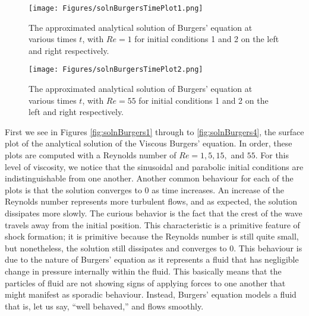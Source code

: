 \documentclass[undefended]{sfuthesis}
\begin{document}
\begin{figure}[h!]
	\centering
	\texttt{[image: Figures/solnBurgersTimePlot1.png]}
	\caption{The approximated analytical solution of Burgers' equation at various times $t$, with $Re = 1$ for initial conditions 1 and 2 on the left and right respectively.}
	\label{fig:solnBurgersTimePlot1}
\end{figure}

\begin{figure}[h!]
	\centering
	\texttt{[image: Figures/solnBurgersTimePlot2.png]}
	\caption{The approximated analytical solution of Burgers' equation at various times $t$, with $Re = 55$ for initial conditions 1 and 2 on the left and right respectively.}
	\label{fig:solnBurgersTimePlot2}
\end{figure}
\clearpage

First we see in Figures \ref{fig:solnBurgers1} through to \ref{fig:solnBurgers4}, the surface plot of the analytical solution of the Viscous Burgers' equation. In order, these plots are computed with a Reynolds number of $Re = 1, 5, 15,$ and $55$. For this level of viscosity, we notice that the sinusoidal and parabolic initial conditions are indistinguishable from one another. Another common behaviour for each of the plots is that the solution converges to 0 as time increases. An increase of the Reynolds number represents more turbulent flows, and as expected, the solution dissipates more slowly. The curious behavior is the fact that the crest of the wave travels away from the initial position. This characteristic is a primitive feature of shock formation; it is primitive because the Reynolds number is still quite small, but nonetheless, the solution still dissipates and converges to 0. This behaviour is due to the nature of Burgers' equation as it represents a fluid that has negligible change in pressure internally within the fluid. This basically means that the particles of fluid are not showing signs of applying forces to one another that might manifest as sporadic behaviour. Instead, Burgers' equation models a fluid that is, let us say, ``well behaved,'' and flows smoothly.
\end{document}
